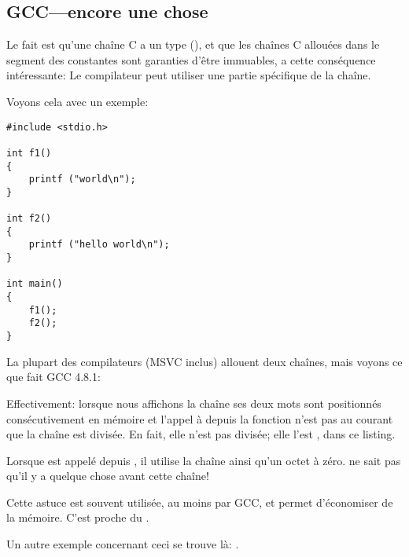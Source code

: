 ﻿\subsection{GCC---encore une chose}
\label{use_parts_of_C_strings}

Le fait est qu'une chaîne C  a un type  (),
et que les chaînes C allouées dans le segment des constantes sont garanties d'être immuables,
a cette conséquence intéressante:
Le compilateur peut utiliser une partie spécifique de la chaîne.

Voyons cela avec un exemple:

\begin{lstlisting}[style=customc]
#include <stdio.h>

int f1()
{
	printf ("world\n");
}

int f2()
{
	printf ("hello world\n");
}

int main()
{
	f1();
	f2();
}
\end{lstlisting}

La plupart des compilateurs \CCpp{} (MSVC inclus) allouent deux chaînes, mais voyons ce que fait GCC 4.8.1:



Effectivement: lorsque nous affichons la chaîne  ses deux mots sont positionnés
consécutivement en mémoire et l'appel à \puts depuis la fonction 
n'est pas au courant que la chaîne est divisée.
En fait, elle n'est pas divisée; elle l'est , dans ce listing.

Lorsque \puts est appelé depuis , il utilise la chaîne  ainsi qu'un
octet à zéro. \puts ne sait pas qu'il y a quelque chose avant cette chaîne!

Cette astuce est souvent utilisée, au moins par GCC, et permet d'économiser de la mémoire.
C'est proche du . %

Un autre exemple concernant ceci se trouve là: .

